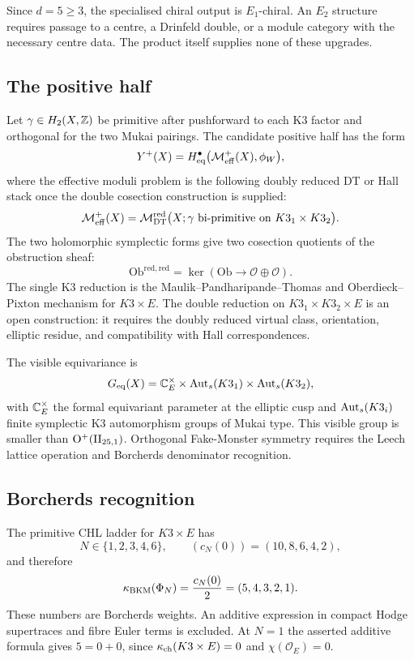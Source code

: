Since $d=5\geq3$, the specialised chiral output is $E_1$-chiral. An
$E_2$ structure requires passage to a centre, a Drinfeld double, or a
module category with the necessary centre data. The product itself
supplies none of these upgrades.

\subsection*{The positive half}
\label{subsec:k3k3e-positive-half}

Let $\gamma\in H_2(X,\mathbb{Z})$ be primitive after pushforward to each K3
factor and orthogonal for the two Mukai pairings. The candidate positive
half has the form
\[
  Y^{+}(X)=H^{\bullet}_{\mathrm{eq}}\bigl(\mathcal{M}^{+}_{\mathrm{eff}}(X),\phi_W\bigr),
\]
where the effective moduli problem is the following doubly reduced DT or
Hall stack once the double cosection construction is supplied:
\[
  \mathcal{M}^{+}_{\mathrm{eff}}(X)=
  \mathcal{M}^{\mathrm{red}}_{\mathrm{DT}}\bigl(X;\gamma\ \text{bi-primitive on }
  K3_1\times K3_2\bigr).
\]
The two holomorphic symplectic forms give two cosection quotients of the
obstruction sheaf:
\[
  \mathrm{Ob}^{\mathrm{red,red}}
  =
  \ker\!\left(\mathrm{Ob}\longrightarrow
  \mathcal O\oplus\mathcal O\right).
\]
The single K3 reduction is the Maulik--Pandharipande--Thomas and
Oberdieck--Pixton mechanism for $K3\times E$. The double reduction on
$K3_1\times K3_2\times E$ is an open construction: it requires the
doubly reduced virtual class, orientation, elliptic residue, and
compatibility with Hall correspondences.

The visible equivariance is
\[
  G_{\mathrm{eq}}(X)=
  \mathbb{C}^{\times}_E\times\mathrm{Aut}_{s}(K3_1)\times\mathrm{Aut}_{s}(K3_2),
\]
with $\mathbb{C}^{\times}_E$ the formal equivariant parameter at the elliptic cusp
and $\mathrm{Aut}_{s}(K3_i)$ finite symplectic K3 automorphism groups of Mukai
type. This visible group is smaller than $\mathrm O^{+}(\mathrm{II}_{25,1})$.
Orthogonal Fake-Monster symmetry requires the Leech lattice operation
and Borcherds denominator recognition.

\subsection*{Borcherds recognition}
\label{subsec:k3k3e-borcherds-recognition}

The primitive CHL ladder for $K3\times E$ has
\[
  N\in\{1,2,3,4,6\},\qquad
  (c_N(0))=(10,8,6,4,2),
\]
and therefore
\[
  \kappa_{\mathrm{BKM}}(\Phi_N)=\frac{c_N(0)}2=(5,4,3,2,1).
\]
These numbers are Borcherds weights. An additive expression in compact
Hodge supertraces and fibre Euler terms is excluded. At $N=1$ the
asserted additive formula gives $5=0+0$, since
$\kappa_{\mathrm{ch}}(K3\times E)=0$ and $\chi(\mathcal O_E)=0$.

